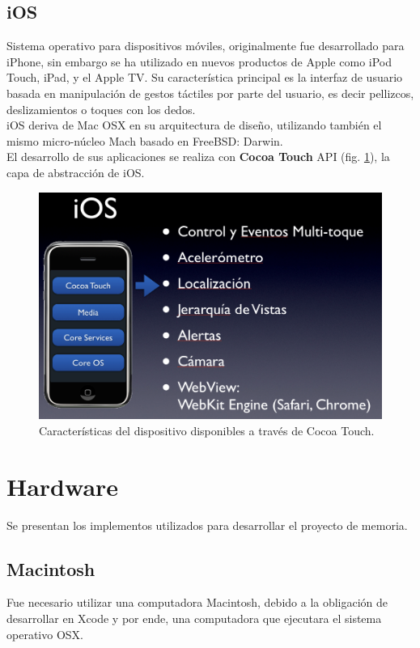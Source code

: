 		\subsection{iOS}
Sistema operativo para dispositivos móviles, originalmente fue desarrollado para iPhone, sin embargo se ha utilizado en nuevos productos de Apple como iPod Touch, iPad, y el Apple TV. Su característica principal es la interfaz de usuario basada en manipulación de gestos táctiles por parte del usuario, es decir pellizcos, deslizamientos o toques con los dedos.\\

iOS deriva de Mac OSX en su arquitectura de diseño, utilizando también el mismo micro-núcleo Mach basado en FreeBSD: Darwin.\\

El desarrollo de sus aplicaciones se realiza con \textbf{Cocoa Touch} API (fig. \ref{fig:ios-cocoatouch}), la capa de abstracción de iOS.
\begin{figure}[H]
	\centering
	\includegraphics[scale=0.35]{imgs/ios-cocoatouch.png} 
	\caption{Características del dispositivo disponibles a través de Cocoa Touch.}
	\label{fig:ios-cocoatouch}
\end{figure}  


	\section{Hardware}
		Se presentan los implementos utilizados para desarrollar el proyecto de memoria.
		\subsection{Macintosh}
		Fue necesario utilizar una computadora Macintosh, debido a la obligación de desarrollar en Xcode y por ende, una computadora que ejecutara el sistema operativo OSX.\\
		
